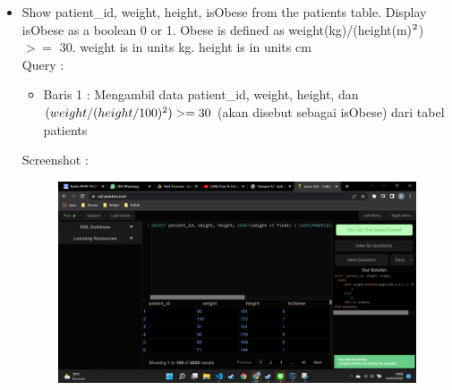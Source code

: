 \documentclass[]{article}
\begin{document}
\begin{itemize}
        \item Show patient\_id, weight, height, isObese from the patients table. Display isObese as a boolean 0 or 1. Obese is defined as weight(kg)/(height(m)$\textsuperscript{2}$) $>=$ 30. weight is in units kg. height is in units cm
        \\Query :
        
        \begin{itemize}
            \item Baris 1 : Mengambil data patient\_id, weight, height, dan
            \\ $(weight/(height/100)\textsuperscript{2}) >= 30$ (akan disebut sebagai isObese) dari tabel patients
        \end{itemize}
        \pagebreak
        Screenshot :
        \begin{figure}[h]
            \includegraphics[scale=0.3]{./Screenshot/Hard-2.png}
            \centering
        \end{figure}


\end{itemize}
\end{document}
